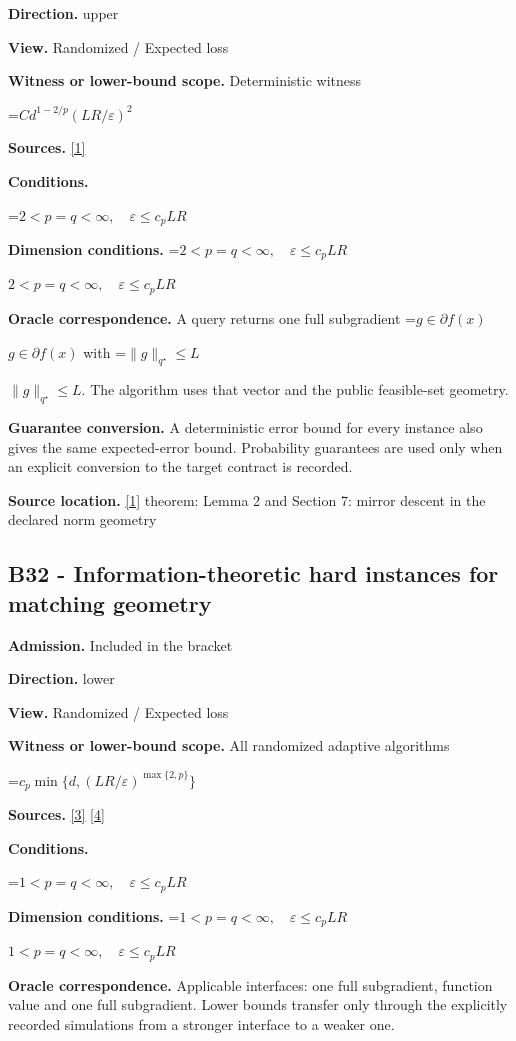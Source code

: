 \documentclass[10pt,a4paper]{article}
\newcommand{\AtlasMath}[1]{\par\begingroup\centering\setbox0=\hbox{$\displaystyle #1$}\ifdim\wd0>1.4\linewidth\typeout{ATLAS WIDE FORMULA: \the\wd0}\fi\ifdim\wd0>\linewidth\resizebox{\linewidth}{!}{\box0}\else\box0\fi\par\endgroup}
\newcommand{\AtlasInlineMath}[1]{\begingroup\setbox0=\hbox{$#1$}\ifdim\wd0>.4\linewidth\endgroup\AtlasMath{#1}\else\endgroup$#1$\fi}
\begin{document}
\textbf{Direction.} upper

\textbf{View.} Randomized / Expected loss

\textbf{Witness or lower-bound scope.} Deterministic witness

\AtlasMath{C d^{1-2/p}(LR/\varepsilon)^2}
\textbf{Sources.} \href{https://arxiv.org/pdf/1107.4080}{[1]}

\textbf{Conditions.} 
\AtlasMath{2<p=q<\infty,\quad\varepsilon\le c_pLR}


\textbf{Dimension conditions.} \AtlasInlineMath{2<p=q<\infty,\quad\varepsilon\le c_pLR}

\textbf{Oracle correspondence.} A query returns one full subgradient \AtlasInlineMath{g\in\partial f(x)} with \AtlasInlineMath{\|g\|_{q^\star}\le L}. The algorithm uses that vector and the public feasible-set geometry.

\textbf{Guarantee conversion.} A deterministic error bound for every instance also gives the same expected-error bound. Probability guarantees are used only when an explicit conversion to the target contract is recorded.

\textbf{Source location.} \href{https://arxiv.org/pdf/1107.4080}{[1]} theorem: Lemma 2 and Section 7: mirror descent in the declared norm geometry

\subsection{B32 - Information-theoretic hard instances for matching geometry}
\textbf{Admission.} Included in the bracket

\textbf{Direction.} lower

\textbf{View.} Randomized / Expected loss

\textbf{Witness or lower-bound scope.} All randomized adaptive algorithms

\AtlasMath{c_p\min\{d,(LR/\varepsilon)^{\max\{2,p\}}\}}
\textbf{Sources.} \href{https://arxiv.org/pdf/2609.20701}{[3]} \href{https://arxiv.org/pdf/2609.20687}{[4]}

\textbf{Conditions.} 
\AtlasMath{1<p=q<\infty,\quad\varepsilon\le c_p LR}


\textbf{Dimension conditions.} \AtlasInlineMath{1<p=q<\infty,\quad\varepsilon\le c_p LR}

\textbf{Oracle correspondence.} Applicable interfaces: one full subgradient, function value and one full subgradient. Lower bounds transfer only through the explicitly recorded simulations from a stronger interface to a weaker one.
\end{document}
